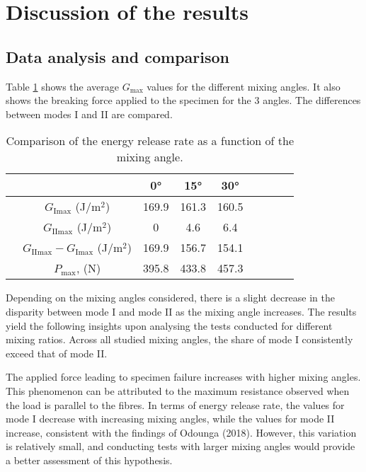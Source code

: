 \section{Discussion of the results}

\subsection{Data analysis and comparison}

Table \ref{fig:Comparison_angle} shows the average $G_\text{max}$ values for the different mixing angles. It also shows the breaking force applied to the specimen for the 3 angles. The differences between modes I and II are compared.

\begin{table} [H]
	\centering
	\begin{tabular}{ccccccccc}
		\toprule %
		&  & 0° & 15° & 30° \\\midrule
		& $G_\text{Imax}$ (J/m$^2$)  & 169.9 & 161.3 & 160.5  \\
		& $G_\text{IImax}$ (J/m$^2$) & 0 & 4.6 & 6.4 \\
		& $G_\text{IImax} - G_\text{Imax}$ (J/m$^2$) & 169.9 & 156.7 & 154.1 \\
		& $P_\text{max}$, (N) & 395.8 & 433.8 & 457.3 \\\bottomrule
	\end{tabular}
	\caption{Comparison of the energy release rate as a function of the mixing angle.}
	\label{fig:Comparison_angle}
\end{table}

Depending on the mixing angles considered, there is a slight decrease in the disparity between mode I and mode II as the mixing angle increases. The results yield the following insights upon analysing the tests conducted for different mixing ratios. Across all studied mixing angles, the share of mode I consistently exceed that of mode II.

The applied force leading to specimen failure increases with higher mixing angles. This phenomenon can be attributed to the maximum resistance observed when the load is parallel to the fibres.
In terms of energy release rate, the values for mode I decrease with increasing mixing angles, while the values for mode II increase, consistent with the findings of Odounga (2018). However, this variation is relatively small, and conducting tests with larger mixing angles would provide a better assessment of this hypothesis.

